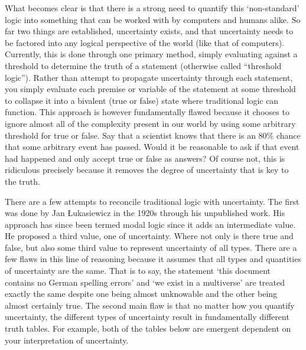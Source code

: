 \documentclass{article}
\begin{document}
What becomes clear is that there is a strong need to quantify this ‘non-standard’ logic into something that can be worked with by computers and humans alike. So far two things are established, uncertainty exists, and that uncertainty needs to be factored into any logical perspective of the world (like that of computers). Currently, this is done through one primary method, simply evaluating against a threshold to determine the truth of a statement (otherwise called “threshold logic”). Rather than attempt to propagate uncertainty through each statement, you simply evaluate each premise or variable of the statement at some threshold to collapse it into a bivalent (true or false) state where traditional logic can function. This approach is however fundamentally flawed because it chooses to ignore almost all of the complexity present in our world by using some arbitrary threshold for true or false. Say that a scientist knows that there is an 80\% chance that some arbitrary event has passed. Would it be reasonable to ask if that event had happened and only accept true or false as answers? Of course not, this is ridiculous precisely because it removes the degree of uncertainty that is key to the truth.

There are a few attempts to reconcile traditional logic with uncertainty. The first was done by Jan Łukasiewicz in the 1920s through his unpublished work. His approach has since been termed modal logic since it adds an intermediate value. He proposed a third value, one of uncertainty. Where not only is there true and false, but also some third value to represent uncertainty of all types. There are a few flaws in this line of reasoning because it assumes that all types and quantities of uncertainty are the same. That is to say, the statement ‘this document contains no German spelling errors’ and ‘we exist in a multiverse’ are treated exactly the same despite one being almost unknowable and the other being almost certainly true. The second main flaw is that no matter how you quantify uncertainty, the different types of uncertainty result in fundamentally different truth tables. For example, both of the tables below are emergent dependent on your interpretation of uncertainty.


\begin{figure}[!ht]
    \centering
    \begin{floatrow}
    \end{floatrow}
  \end{figure}
\end{document}
